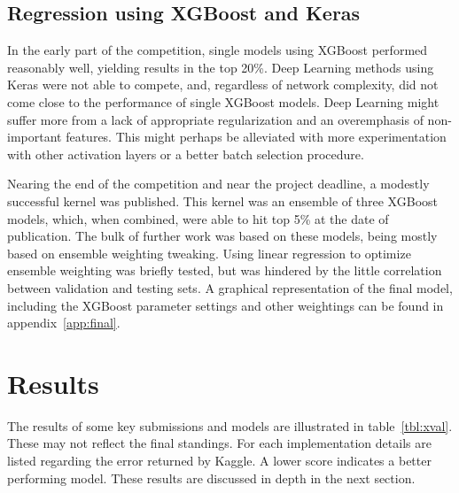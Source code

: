 \documentclass[a4paper,11pt,twocolumn]{article}
\begin{document}
\subsection{Regression using XGBoost and Keras}
In the early part of the competition, single models using XGBoost performed
reasonably well, yielding results in the top 20\%. Deep Learning methods using
Keras were not able to compete, and, regardless of network complexity, did not
come close to the performance of single XGBoost models. Deep Learning might
suffer more from a lack of appropriate regularization and an overemphasis of
non-important features. This might perhaps be alleviated with more
experimentation with other activation layers or a better batch selection
procedure.

Nearing the end of the competition and near the project deadline, a modestly
successful kernel was published. This kernel was an ensemble of three XGBoost
models, which, when combined, were able to hit top 5\% at the date of
publication. The bulk of further work was based on these models, being mostly
based on ensemble weighting tweaking. Using linear regression to optimize
ensemble weighting was briefly tested, but was hindered by the little
correlation between validation and testing sets. A graphical representation of
the final model, including the XGBoost parameter settings and other weightings
can be found in appendix~\ref{app:final}.

\section{Results}
The results of some key submissions and models are illustrated in
table~\ref{tbl:xval}. These
may not reflect the final standings. For each implementation details are listed
regarding the error returned by Kaggle. A lower score indicates a better
performing model. These results are discussed in depth in the next section.
\end{document}
